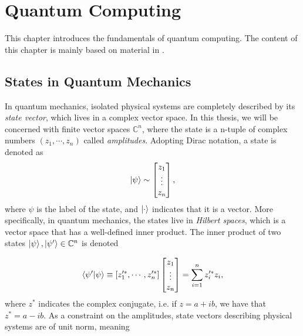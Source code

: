 \chapter{Quantum Computing}\label{chap:QuantumComputing}
This chapter introduces the fundamentals of quantum computing. The content of this chapter is mainly based on material in \cite{NielsenQuantum}.


\section{States in Quantum Mechanics}\label{sec:IntroQM}
In quantum mechanics, isolated physical systems are completely described by its \emph{state vector}, which lives in a complex vector space. In this thesis, we will be concerned with finite vector spaces $\mathbb{C}^n$, where the state is a n-tuple of complex numbers $(z_1, \cdots, z_n)$ called \emph{amplitudes}. Adopting Dirac notation, a state is denoted as 
\begin{equation}
    \ket{\psi} \sim \begin{bmatrix}
           z_{1} \\
           \vdots \\
           z_{n}
         \end{bmatrix},
\end{equation}
where $\psi$ is the label of the state, and $\ket{\cdot}$ indicates that it is a vector. More specifically, in quantum mechanics, the states live in \emph{Hilbert spaces}, which is a vector space that has a well-defined inner product. The inner product of two states $\ket{\psi}, \ket{\psi'} \in \mathbb{C}^n$ is denoted 

\begin{equation}
    \braket{\psi'}{\psi} \equiv [z_1'^*, \cdots, z_n'^*] 
    \begin{bmatrix}
        z_{1} \\
        \vdots \\
        z_{n}
    \end{bmatrix}
    = \sum_{i=1}^{n} z_i'^* z_i, 
\end{equation}
where $z^*$ indicates the complex conjugate, i.e. if $z = a + ib$, we have that $z^* = a - ib$. As a constraint on the amplitudes, state vectors describing physical systems are of unit norm, meaning 

